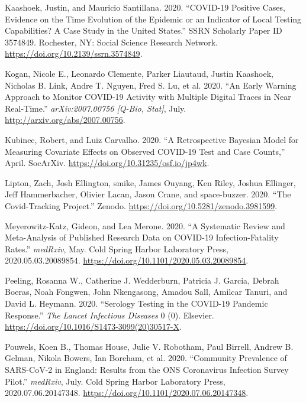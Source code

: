 \documentclass[10pt,letterpaper]{article}
\begin{document}
\leavevmode\hypertarget{ref-kaashoekCOVID19PositiveCases2020a}{}%
Kaashoek, Justin, and Mauricio Santillana. 2020. ``COVID-19 Positive
Cases, Evidence on the Time Evolution of the Epidemic or an Indicator of
Local Testing Capabilities? A Case Study in the United States.'' SSRN
Scholarly Paper ID 3574849. Rochester, NY: Social Science Research
Network. \url{https://doi.org/10.2139/ssrn.3574849}.

\leavevmode\hypertarget{ref-koganEarlyWarningApproach2020}{}%
Kogan, Nicole E., Leonardo Clemente, Parker Liautaud, Justin Kaashoek,
Nicholas B. Link, Andre T. Nguyen, Fred S. Lu, et al. 2020. ``An Early
Warning Approach to Monitor COVID-19 Activity with Multiple Digital
Traces in Near Real-Time.'' \emph{arXiv:2007.00756 {[}Q-Bio, Stat{]}},
July. \url{http://arxiv.org/abs/2007.00756}.

\leavevmode\hypertarget{ref-kubinecRetrospectiveBayesianModel2020}{}%
Kubinec, Robert, and Luiz Carvalho. 2020. ``A Retrospective Bayesian
Model for Measuring Covariate Effects on Observed COVID-19 Test and Case
Counts,'' April. SocArXiv. \url{https://doi.org/10.31235/osf.io/jp4wk}.

\leavevmode\hypertarget{ref-zachliptonCovidTrackingProject2020}{}%
Lipton, Zach, Josh Ellington, smike, James Ouyang, Ken Riley, Joshua
Ellinger, Jeff Hammerbacher, Olivier Lacan, Jason Crane, and
space-buzzer. 2020. ``The Covid-Tracking Project.'' Zenodo.
\url{https://doi.org/10.5281/zenodo.3981599}.

\leavevmode\hypertarget{ref-meyerowitz-katzSystematicReviewMetaanalysis2020}{}%
Meyerowitz-Katz, Gideon, and Lea Merone. 2020. ``A Systematic Review and
Meta-Analysis of Published Research Data on COVID-19 Infection-Fatality
Rates.'' \emph{medRxiv}, May. Cold Spring Harbor Laboratory Press,
2020.05.03.20089854. \url{https://doi.org/10.1101/2020.05.03.20089854}.

\leavevmode\hypertarget{ref-peelingSerologyTestingCOVID192020}{}%
Peeling, Rosanna W., Catherine J. Wedderburn, Patricia J. Garcia, Debrah
Boeras, Noah Fongwen, John Nkengasong, Amadou Sall, Amilcar Tanuri, and
David L. Heymann. 2020. ``Serology Testing in the COVID-19 Pandemic
Response.'' \emph{The Lancet Infectious Diseases} 0 (0). Elsevier.
\url{https://doi.org/10.1016/S1473-3099(20)30517-X}.

\leavevmode\hypertarget{ref-pouwelsCommunityPrevalenceSARSCoV22020}{}%
Pouwels, Koen B., Thomas House, Julie V. Robotham, Paul Birrell, Andrew
B. Gelman, Nikola Bowers, Ian Boreham, et al. 2020. ``Community
Prevalence of SARS-CoV-2 in England: Results from the ONS Coronavirus
Infection Survey Pilot.'' \emph{medRxiv}, July. Cold Spring Harbor
Laboratory Press, 2020.07.06.20147348.
\url{https://doi.org/10.1101/2020.07.06.20147348}.
\end{document}
